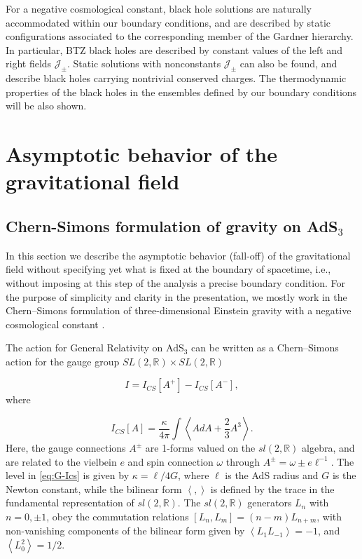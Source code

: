 \documentclass[letterpaper,11pt,oneside]{book}
\begin{document}
For a negative cosmological constant, black hole solutions are naturally
accommodated within our boundary conditions, and are described by
static configurations associated to the corresponding member of the
Gardner hierarchy. In particular, BTZ black holes \cite{Banados:1992wn,Banados:1992gq}
are described by constant values of the left and right fields $\mathcal{J}_{\pm}$.
Static solutions with nonconstants $\mathcal{J}_{\pm}$ can also be
found, and describe black holes carrying nontrivial conserved charges.
The thermodynamic properties of the black holes in the ensembles defined
by our boundary conditions will be also shown.

\newpage{}




\section{Asymptotic behavior of the gravitational field\label{sec:G-Asymp}}

\subsection{Chern-Simons formulation of gravity on AdS$_{3}$\label{subsec:Chern-Simons pure gravity AdS3}}

In this section we describe the asymptotic behavior (fall-off) of
the gravitational field without specifying yet what is fixed at the
boundary of spacetime, i.e., without imposing at this step of the
analysis a precise boundary condition. For the purpose of simplicity
and clarity in the presentation, we mostly work in the Chern--Simons
formulation of three-dimensional Einstein gravity with a negative
cosmological constant \cite{Achucarro:1987vz,Witten:1988hc}.

The action for General Relativity on AdS$_{3}$ can be written as
a Chern--Simons action for the gauge group $SL(2,\mathbb{R})\times SL(2,\mathbb{R})$

\[
I=I_{CS}\left[A^{+}\right]-I_{CS}\left[A^{-}\right],
\]
where

\begin{equation}
	I_{CS}\left[A\right]=\frac{\kappa}{4\pi}\int\left\langle AdA+\frac{2}{3}A^{3}\right\rangle .\label{eq:G-Ics}
\end{equation}
Here, the gauge connections $A^{\pm}$ are 1-forms valued on the $sl(2,\mathbb{R})$
algebra, and are related to the vielbein $e$ and spin connection
$\omega$ through $A^{\pm}=\omega\pm e\ell^{-1}$. The level in \eqref{eq:G-Ics}
is given by $\kappa=\ell/4G$, where $\ell$ is the AdS radius and
$G$ is the Newton constant, while the bilinear form $\left\langle ,\right\rangle $
is defined by the trace in the fundamental representation of $sl(2,\mathbb{R})$.
The $sl(2,\mathbb{R})$ generators $L_{n}$ with $n=0,\pm1$, obey
the commutation relations $\left[L_{n},L_{m}\right]=\left(n-m\right)L_{n+m}$,
with non-vanishing components of the bilinear form given by $\left\langle L_{1}L_{-1}\right\rangle =-1$,
and $\left\langle L_{0}^{2}\right\rangle =1/2$.
\end{document}
